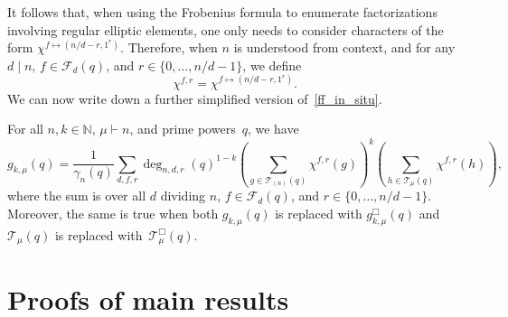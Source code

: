 \documentclass[Unicode,ALCO]{cedram}
\newcommand{\CF}{\mathcal{F}}
\newcommand{\N}{\mathbb{N}}
\newcommand{\CT}{\mathcal{T}}
\begin{document}
It follows that, when using the Frobenius formula to enumerate factorizations involving regular elliptic elements, one only needs to consider characters of the form \(\chi^{f \mapsto (n/d-r,1^r)}\).
Therefore, when \(n\) is understood from context, and for any \(d \mid n\), \(f \in \CF_d (q)\), and \(r \in \{0,\ldots,n/d-1\}\), we define
\begin{equation}
\chi^{f,r} = \chi^{f \mapsto (n/d-r,1^r)}.
\end{equation}
We can now write down a further simplified version of~\eqref{ff_in_situ}.
\begin{corollary}
\label{simpler_ff_in_situ_corollary}
For all \(n,k \in \N\), \(\mu \vdash n\), and prime powers~\(q\), we have
\begin{equation}
\label{simpler_ff_in_situ}
g_{k,\mu} (q)
=
\frac{1}{\gamma_n(q)}
\sum_{d,f,r}
\deg_{n,d,r}(q)^{1-k}
\left ( \sum_{g \in \CT_{(n)} (q)} \chi^{f,r}(g) \right )^k
\left ( \sum_{h \in \CT_\mu (q)}   \chi^{f,r}(h) \right ),
\end{equation}
where the sum is over all \(d\) dividing \(n\), \(f \in \CF_d (q)\), and \(r \in \{0,\ldots,n/d-1\}\).
Moreover, the same is true when both \(g_{k,\mu} (q)\) is replaced with \(g_{k,\mu}^\Box (q)\) and \(\CT_\mu (q)\) is replaced with~\(\CT_\mu^\Box (q)\).
\end{corollary}















































\section{Proofs of main results}
\label{main_results_section}
\end{document}
